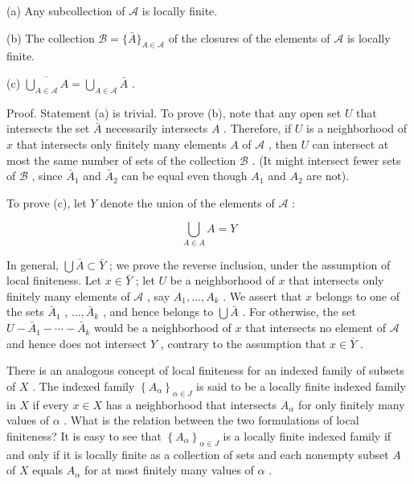 \documentclass[10pt]{article}
\begin{document}
(a) Any subcollection of \(\mathcal{A}\) is locally finite.

(b) The collection \(\mathcal{B} = \{ \bar{A}{\} }_{A \in  \mathcal{A}}\) of the closures of the elements of \(\mathcal{A}\) is locally finite.

(c) \(\overline{\mathop{\bigcup }\limits_{{A \in  \mathcal{A}}}A} = \mathop{\bigcup }\limits_{{A \in  \mathcal{A}}}\bar{A}\) .

Proof. Statement (a) is trivial. To prove (b), note that any open set \(U\) that intersects the set \(\bar{A}\) necessarily intersects \(A\) . Therefore, if \(U\) is a neighborhood of \(x\) that intersects only finitely many elements \(A\) of \(\mathcal{A}\) , then \(U\) can intersect at most the same number of sets of the collection \(\mathcal{B}\) . (It might intersect fewer sets of \(\mathcal{B}\) , since \({\bar{A}}_{1}\) and \({\bar{A}}_{2}\) can be equal even though \({A}_{1}\) and \({A}_{2}\) are not).

To prove (c), let \(Y\) denote the union of the elements of \(\mathcal{A}\) :

\[
\mathop{\bigcup }\limits_{{A \in  A}}A = Y
\]

In general, \(\bigcup \bar{A} \subset  \bar{Y}\) ; we prove the reverse inclusion, under the assumption of local finiteness. Let \(x \in  \bar{Y}\) ; let \(U\) be a neighborhood of \(x\) that intersects only finitely many elements of \(\mathcal{A}\) , say \({A}_{1},\ldots ,{A}_{k}\) . We assert that \(x\) belongs to one of the sets \({\bar{A}}_{1}\) , \(\ldots ,{\bar{A}}_{k}\) , and hence belongs to \(\bigcup \bar{A}\) . For otherwise, the set \(U - {\bar{A}}_{1} - \cdots  - {\bar{A}}_{k}\) would be a neighborhood of \(x\) that intersects no element of \(\mathcal{A}\) and hence does not intersect \(Y\) , contrary to the assumption that \(x \in  \bar{Y}\) .

There is an analogous concept of local finiteness for an indexed family of subsets of \(X\) . The indexed family \({\left\{  {A}_{\alpha }\right\}  }_{\alpha  \in  J}\) is said to be a locally finite indexed family in \(X\) if every \(x \in  X\) has a neighborhood that intersects \({A}_{\alpha }\) for only finitely many values of \(\alpha\) . What is the relation between the two formulations of local finiteness? It is easy to see that \({\left\{  {A}_{\alpha }\right\}  }_{\alpha  \in  J}\) is a locally finite indexed family if and only if it is locally finite as a collection of sets and each nonempty subset \(A\) of \(X\) equals \({A}_{\alpha }\) for at most finitely many values of \(\alpha\) .
\end{document}
